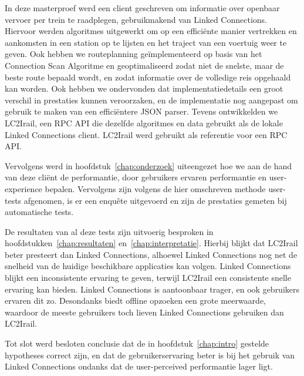 In deze masterproef werd een client geschreven om informatie over openbaar vervoer per trein te raadplegen, gebruikmakend van Linked Connections. Hiervoor werden algoritmes uitgewerkt om op een efficiënte manier vertrekken en aankomsten in een station op te lijsten en het traject van een voertuig weer te geven. Ook hebben we routeplanning geïmplementeerd op basis van het Connection Scan Algoritme en geoptimaliseerd zodat niet de snelste, maar de beste route bepaald wordt, en zodat informatie over de volledige reis opgehaald kan worden. Ook hebben we ondervonden dat implementatiedetails een groot verschil in prestaties kunnen veroorzaken, en de implementatie nog aangepast om gebruik te maken van een efficiëntere JSON parser. Tevens ontwikkelden we LC2Irail, een RPC API die dezelfde algoritmes en data gebruikt als de lokale Linked Connections client. LC2Irail werd gebruikt als referentie voor een RPC API.
	
Vervolgens werd in hoofdstuk~\ref{chap:onderzoek} uiteengezet hoe we aan de hand van deze cliënt de performantie, door gebruikers ervaren performantie en user-experience bepalen. Vervolgens zijn volgens de hier omschreven methode user-tests afgenomen, is er een enquête uitgevoerd en zijn de prestaties gemeten bij automatische tests. 
	
De resultaten van al deze tests zijn uitvoerig besproken in hoofdstukken~\ref{chap:resultaten} en~\ref{chap:interpretatie}. Hierbij blijkt dat LC2Irail beter presteert dan Linked Connections, alhoewel Linked Connections nog net de snelheid van de huidige beschikbare applicaties kan volgen. Linked Connections blijkt een inconsistente ervaring te geven, terwijl LC2Irail een consistente snelle ervaring kan bieden. Linked Connections is aantoonbaar trager, en ook gebruikers ervaren dit zo. Desondanks biedt offline opzoeken een grote meerwaarde, waardoor de meeste gebruikers toch lieven Linked Connections gebruiken dan LC2Irail.
	
Tot slot werd besloten conclusie dat de in hoofdstuk~\ref{chap:intro} gestelde hypotheses correct zijn, en dat de gebruikerservaring beter is bij het gebruik van Linked Connections ondanks dat de user-perceived performantie lager ligt.